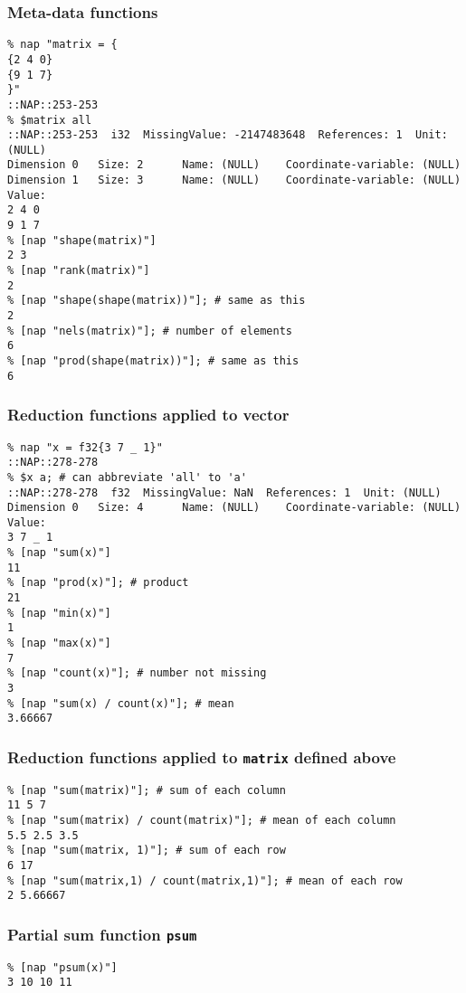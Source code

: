 \subsubsection{Meta-data functions}

  \begin{verbatim}
% nap "matrix = {
{2 4 0}
{9 1 7}
}"
::NAP::253-253
% $matrix all
::NAP::253-253  i32  MissingValue: -2147483648  References: 1  Unit: (NULL)
Dimension 0   Size: 2      Name: (NULL)    Coordinate-variable: (NULL)
Dimension 1   Size: 3      Name: (NULL)    Coordinate-variable: (NULL)
Value:
2 4 0
9 1 7
% [nap "shape(matrix)"]
2 3
% [nap "rank(matrix)"]
2
% [nap "shape(shape(matrix))"]; # same as this
2
% [nap "nels(matrix)"]; # number of elements
6
% [nap "prod(shape(matrix))"]; # same as this
6
\end{verbatim}

\subsubsection{Reduction functions applied to vector}

  \begin{verbatim}
% nap "x = f32{3 7 _ 1}"
::NAP::278-278
% $x a; # can abbreviate 'all' to 'a'
::NAP::278-278  f32  MissingValue: NaN  References: 1  Unit: (NULL)
Dimension 0   Size: 4      Name: (NULL)    Coordinate-variable: (NULL)
Value:
3 7 _ 1
% [nap "sum(x)"]
11
% [nap "prod(x)"]; # product
21
% [nap "min(x)"]
1
% [nap "max(x)"]
7
% [nap "count(x)"]; # number not missing
3
% [nap "sum(x) / count(x)"]; # mean
3.66667
\end{verbatim}

\subsubsection{Reduction functions applied to \texttt{matrix} defined above}

  \begin{verbatim}
% [nap "sum(matrix)"]; # sum of each column
11 5 7
% [nap "sum(matrix) / count(matrix)"]; # mean of each column
5.5 2.5 3.5
% [nap "sum(matrix, 1)"]; # sum of each row
6 17
% [nap "sum(matrix,1) / count(matrix,1)"]; # mean of each row
2 5.66667
\end{verbatim}

\subsubsection{Partial sum function \texttt{psum}}

  \begin{verbatim}
% [nap "psum(x)"]
3 10 10 11
\end{verbatim}


